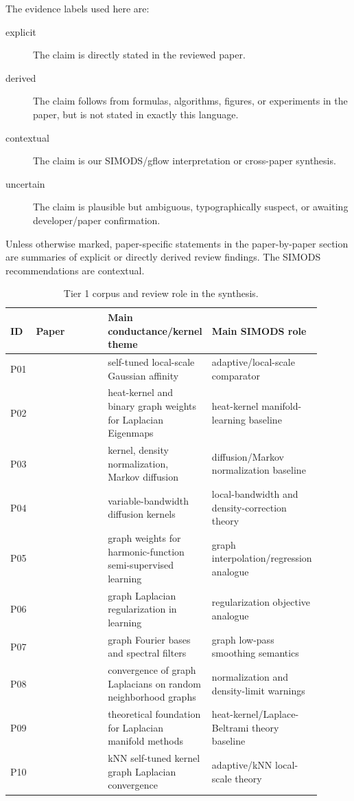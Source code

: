 \documentclass[11pt]{article}
\begin{document}
The evidence labels used here are:

\begin{description}
  \item[explicit] The claim is directly stated in the reviewed paper.
  \item[derived] The claim follows from formulas, algorithms, figures, or
    experiments in the paper, but is not stated in exactly this language.
  \item[contextual] The claim is our SIMODS/gflow interpretation or
    cross-paper synthesis.
  \item[uncertain] The claim is plausible but ambiguous, typographically
    suspect, or awaiting developer/paper confirmation.
\end{description}

Unless otherwise marked, paper-specific statements in the paper-by-paper
section are summaries of explicit or directly derived review findings.  The
SIMODS recommendations are contextual.

\begin{longtable}{p{0.08\linewidth}p{0.40\linewidth}p{0.20\linewidth}p{0.22\linewidth}}
\caption{Tier 1 corpus and review role in the synthesis.}\\
\toprule
ID & Paper & Main conductance/kernel theme & Main SIMODS role\\
\midrule
\endhead
P01 & \citet{zelnikmanor2004selftuning} & self-tuned local-scale Gaussian affinity & adaptive/local-scale comparator\\
P02 & \citet{belkin2001laplacian} & heat-kernel and binary graph weights for Laplacian Eigenmaps & heat-kernel manifold-learning baseline\\
P03 & \citet{coifman2006diffusion} & kernel, density normalization, Markov diffusion & diffusion/Markov normalization baseline\\
P04 & \citet{berry2016variable} & variable-bandwidth diffusion kernels & local-bandwidth and density-correction theory\\
P05 & \citet{zhu2003semisupervised} & graph weights for harmonic-function semi-supervised learning & graph interpolation/regression analogue\\
P06 & \citet{belkin2006manifold} & graph Laplacian regularization in learning & regularization objective analogue\\
P07 & \citet{shuman2013emerging} & graph Fourier bases and spectral filters & graph low-pass smoothing semantics\\
P08 & \citet{hein2007graph} & convergence of graph Laplacians on random neighborhood graphs & normalization and density-limit warnings\\
P09 & \citet{belkin2008towards} & theoretical foundation for Laplacian manifold methods & heat-kernel/Laplace-Beltrami theory baseline\\
P10 & \citet{cheng2022knn} & kNN self-tuned kernel graph Laplacian convergence & adaptive/kNN local-scale theory\\
\bottomrule
\end{longtable}
\end{document}
